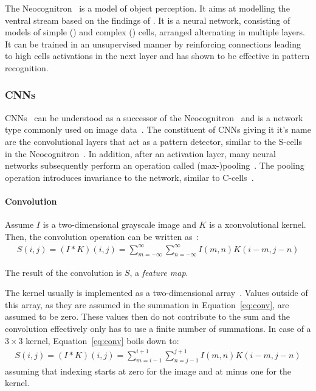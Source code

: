 The Neocognitron~\citep{fukushima1980neocognitron} is a model of object perception.
It aims at modelling the ventral stream based on the findings of \citet{hubel1962receptive}.
It is a neural network, consisting of models of simple () and complex () cells, arranged alternating in multiple layers.
It can be trained in an unsupervised manner by reinforcing connections leading to high cells activations in the next layer and has shown to be effective in pattern recognition.

\subsubsection{\acp{CNN}}
\acp{CNN}~\citep{lecun1989backpropagation} can be understood as a successor of the Neocognitron~\citep{lindsay2020convolutional} and is a network type commonly used on image data~\citep[p. 326]{Goodfellow-et-al-2016}.
The constituent of \acp{CNN} giving it it's name are the convolutional layers that act as a pattern detector, similar to the S-cells in the Neocognitron~\citep{lindsay2020convolutional}.
In addition, after an activation layer, many neural networks subsequently perform an operation called (max-)pooling~\citep[pp. 326, 339]{Goodfellow-et-al-2016}.
The pooling operation introduces invariance to the network, similar to C-cells~\citep{lindsay2020convolutional}.

\paragraph{Convolution}

Assume $I$ is a two-dimensional grayscale image and $K$ is a xconvolutional kernel.
Then, the convolution operation can be written as~\citep[p. 327]{Goodfellow-et-al-2016}:
\begin{align}
    S(i, j)=(I * K)(i, j)=\sum_{m=-\infty}^{\infty} \sum_{n=-\infty}^{\infty} I(m, n) K(i-m, j-n) \label{eq:conv}
\end{align}

The result of the convolution is $S$, a \textit{feature map}.

The kernel usually is implemented as a two-dimensional array~\citep[p. 327]{Goodfellow-et-al-2016}.
Values outside of this array, as they are assumed in the summation in Equation~\ref{eq:conv}, are assumed to be zero.
These values then do not contribute to the sum and the convolution effectively only has to use a finite number of summations.
In case of a $3\times 3$ kernel, Equation~\ref{eq:conv} boils down to:
\begin{align}
    S(i, j)=(I * K)(i, j)=\sum_{m=i-1}^{i+1} \sum_{n=j-1}^{j+1} I(m, n) K(i-m, j-n) \label{eq:conv_boiled_down}
\end{align}
assuming that indexing starts at zero for the image and at minus one for the kernel.

